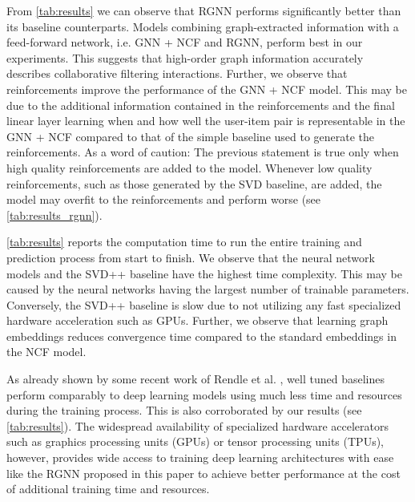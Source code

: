 From \autoref{tab:results} we can observe that RGNN performs significantly better than its baseline counterparts. Models combining graph-extracted information with a feed-forward network, i.e. GNN + NCF and RGNN, perform best in our experiments. This suggests that high-order graph information accurately describes collaborative filtering interactions. Further, we observe that reinforcements improve the performance of the GNN + NCF model. This may be due to the additional information contained in the reinforcements and the final linear layer learning when and how well the user-item pair is representable in the GNN + NCF compared to that of the simple baseline used to generate the reinforcements. As a word of caution: The previous statement is true only when high quality reinforcements are added to the model. Whenever low quality reinforcements, such as those generated by the SVD baseline, are added, the model may overfit to the reinforcements and perform worse (see \autoref{tab:results_rgnn}).

\autoref{tab:results} reports the computation time to run the entire training and prediction process from start to finish. We observe that the neural network models and the SVD++ baseline have the highest time complexity. This may be caused by the neural networks having the largest number of trainable parameters. Conversely, the SVD++ baseline is slow due to not utilizing any fast specialized hardware acceleration such as GPUs. Further, we observe that learning graph embeddings reduces convergence time compared to the standard embeddings in the NCF model.

As already shown by some recent work of Rendle et al. \cite{rendle2019difficulty}, well tuned baselines perform comparably to deep learning models using much less time and resources during the training process. This is also corroborated by our results (see \autoref{tab:results}). The widespread availability of specialized hardware accelerators such as graphics processing units (GPUs) or tensor processing units (TPUs), however, provides wide access to training deep learning architectures with ease like the RGNN proposed in this paper to achieve better performance at the cost of additional training time and resources.
